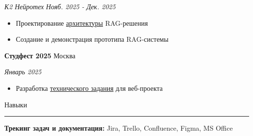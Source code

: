 \documentclass[14pt, a4paper, oneside]{extarticle}
\begin{document}
\begin{flushleft}
	\vspace{-1\intextsep}
	\quad
	\textit{К2 Нейротех}
	\hfill
	\textit{\small Нояб. 2025 - Дек. 2025}
\end{flushleft}


\begin{itemize}
	\vspace{-2\intextsep}
	\item Проектирование \href{https://github.com/Crazy5202/job_application_form/tree/main/portfolio/K2/RAG_C4.pdf}{архитектуры} RAG-решения
	\vspace{-0.8\intextsep}
    \item Создание и демонстрация прототипа RAG-системы
\end{itemize}


\begin{flushleft}
	\vspace{-0.8\intextsep}
	\quad
	\textbf{Студфест 2025}
	\hfill
	Москва
\end{flushleft}

\begin{flushleft}
	\vspace{-1\intextsep}
	\quad
	\hfill
	\textit{\small Январь 2025}
\end{flushleft}


\begin{itemize}
	\vspace{-2\intextsep}
	\item Разработка \href{https://github.com/Crazy5202/job_application_form/tree/main/portfolio/OnlyGames%5B%D0%A2ex_%D0%97%D0%B0%D0%B4%D0%B0%D0%BD%D0%B8%D0%B5%5D.pdf}{технического задания} для веб-проекта
\end{itemize}


\begin{flushleft}
	\vspace{-\intextsep}
	\large Навыки
\end{flushleft}

\vspace{-0.8\intextsep}
\hrule


\vspace{0.5\intextsep}

\textbf{Трекинг задач и документация:} Jira, Trello, Confluence, Figma, MS Office
\end{document}
